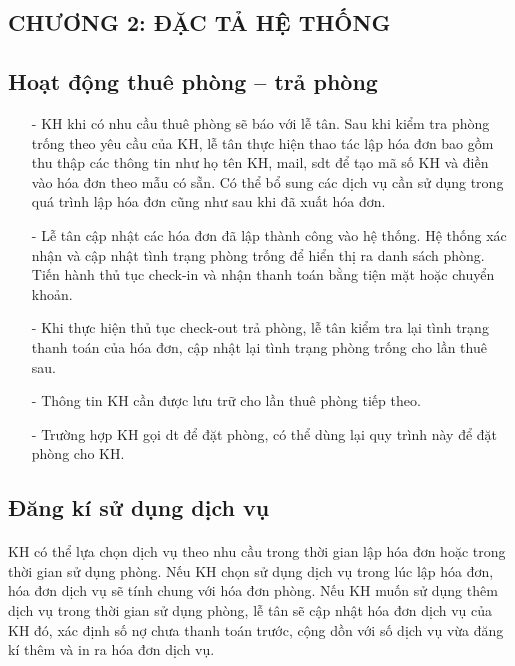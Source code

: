 \documentclass{article}
\begin{document}
\begin{flushleft}
		\fontsize{16}{20}\selectfont
		\section*{CHƯƠNG 2: ĐẶC TẢ HỆ THỐNG}
		\fontsize{14}{20}\selectfont
		\setcounter{section}{2}
		\subsection{Hoạt động thuê phòng – trả phòng}
		\fontsize{13}{13}\selectfont
		\begin{itemize}
		
			\item[-] KH khi có nhu cầu thuê phòng sẽ báo với lễ tân. Sau khi kiểm tra phòng trống theo yêu cầu của KH, lễ tân thực hiện thao tác lập hóa đơn bao gồm thu thập các thông tin như họ tên KH, mail, sdt để tạo mã số KH và điền vào hóa đơn theo mẫu có sẵn. Có thể bổ sung các dịch vụ cần sử dụng trong quá trình lập hóa đơn cũng như sau khi đã xuất hóa đơn. 
			\item[-] Lễ tân cập nhật các hóa đơn đã lập thành công vào hệ thống. Hệ thống xác nhận và cập nhật tình trạng phòng trống để hiển thị ra danh sách phòng. Tiến hành thủ tục check-in và nhận thanh toán bằng tiện mặt hoặc chuyển khoản.
			\item[-]Khi thực hiện thủ tục check-out trả phòng, lễ tân kiểm tra lại tình trạng thanh toán của hóa đơn, cập nhật lại tình trạng phòng trống cho lần thuê sau.
			\item[-]Thông tin KH cần được lưu trữ cho lần thuê phòng tiếp theo.
			\item[-]Trường hợp KH gọi dt để đặt phòng, có thể dùng lại quy trình này để đặt phòng cho KH.
			
		\end{itemize}
		
		\fontsize{14}{20}\selectfont
		\subsection{Đăng kí sử dụng dịch vụ}
		\fontsize{13}{20}\selectfont
		\paragraph{}
       KH có thể lựa chọn dịch vụ theo nhu cầu trong thời gian lập hóa đơn hoặc trong thời gian sử dụng phòng. Nếu KH chọn sử dụng dịch vụ trong lúc lập hóa đơn, hóa đơn dịch vụ sẽ tính chung với hóa đơn phòng. Nếu KH muốn sử dụng thêm dịch vụ trong thời gian sử dụng phòng, lễ tân sẽ cập nhật hóa đơn dịch vụ của KH đó, xác định số nợ chưa thanh toán trước, cộng dồn với số dịch vụ vừa đăng kí thêm và in ra hóa đơn dịch vụ.
		

\end{flushleft}
\end{document}

